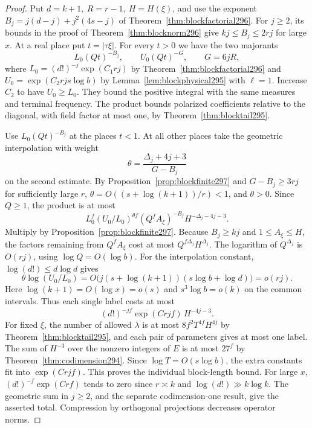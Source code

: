 \documentclass[a4paper,11pt]{article}
\theoremstyle{definition}
\theoremstyle{remark}
\numberwithin{equation}{section}
\begin{document}
\begin{proof}
Put \(d=k+1,\ R=r-1,\ H=H(\xi)\), and use the exponent
\(B_j=j(d-j)+j^2(4s-j)\) of Theorem~\ref{thm:blockfactorial296}.
For \(j\ge2\), its bounds in the proof of
Theorem~\ref{thm:blocknorm296} give \(kj\le B_j\le 2rj\)
for large \(x\). At a real place put \(t=|\tau\xi|\).
For every \(t>0\) we have the two majorants
\[
       L_0(Qt)^{-B_j},\qquad U_0(Qt)^{-G},\qquad
                  G=6jR,
\]
where \(L_0=(d!)^{-j}\exp(C_1rj)\) by
Theorem~\ref{thm:blockfactorial296} and
\(U_0=\exp(C_2rjs\log b)\) by Lemma~\ref{lem:blockphysical295}
with \(\ell=1\). Increase \(C_2\) to have \(U_0\ge L_0\).
They bound the positive integral with the same measures
and terminal frequency. The product bounds polarized
coefficients relative to the diagonal, with field factor at
most one, by Theorem~\ref{thm:blocktail295}.

Use \(L_0(Qt)^{-B_j}\) at the places \(t<1\). At all other
places take the geometric interpolation with weight
\[
               \theta=\frac{\Delta_j+4j+3}{G-B_j}
\]
on the second estimate. By Proposition~\ref{prop:blockfinite297}
and \(G-B_j\ge 3rj\) for sufficiently large \(r\),
\(\theta=O((s+\log(k+1))/r)<1\), and \(\theta>0\).
Since \(Q\ge1\), the product is at most
\[
    L_0^f (U_0/L_0)^{\theta f}
         (Q^f A_\xi)^{-B_j} H^{-\Delta_j-4j-3}.
\]
Multiply by Proposition~\ref{prop:blockfinite297}. Because
\(B_j\ge kj\) and \(1\le A_\xi\le H\), the factors remaining
from \(Q^f A_\xi\) cost at most \(Q^{f\Delta_j}H^{\Delta_j}\).
The logarithm of \(Q^{\Delta_j}\) is \(O(rj)\), using
\(\log Q=O(\log b)\). For the interpolation constant,
\(\log(d!)\le d\log d\) gives
\[
     \theta\log(U_0/L_0)
          =O\bigl(j(s+\log(k+1))(s\log b+\log d)\bigr)
          =o(rj).
\]
Here \(\log(k+1)=O(\log x)=o(s)\) and
\(s^3\log b=o(k)\) on the common intervals. Thus each single
label costs at most
\[
                  (d!)^{-jf}\exp(Crjf)\,H^{-4j-3}.
\]
For fixed \(\xi\), the number of allowed \(\lambda\) is at most
\(8f^2T^{4f}H^{4j}\) by Theorem~\ref{thm:blocktail295},
and each pair of parameters gives at most one label.
The sum of \(H^{-3}\) over the nonzero integers of \(E\)
is at most \(27^f\) by Theorem~\ref{thm:codimension294}.
Since \(\log T=O(s\log b)\), the extra constants fit into
\(\exp(Crjf)\). This proves the individual block-length
bound. For large \(x\), \((d!)^{-f}\exp(Crf)\) tends to
zero since \(r\asymp k\) and \(\log(d!)\gg k\log k\).
The geometric sum in \(j\ge2\), and the separate
codimension-one result, give the asserted total. Compression
by orthogonal projections decreases operator norms.
\end{proof}
\end{document}
